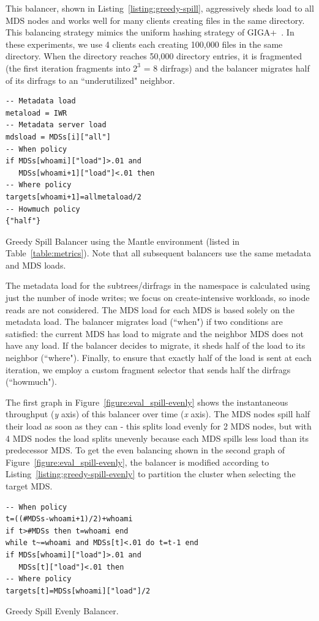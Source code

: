 This balancer, shown in Listing~\ref{listing:greedy-spill}, aggressively sheds load to all MDS nodes and works well for many clients creating files in the same directory. This balancing strategy mimics the uniform hashing strategy of GIGA+~\cite{patil:fast2011-giga+, ren:sc2014-indexfs}. In these experiments, we use 4 clients each creating 100,000 files in the same directory. When the directory reaches 50,000 directory entries, it is fragmented (the first iteration fragments into \(2^{3}\) = 8 dirfrags) and the balancer migrates half of its dirfrags to an ``underutilized" neighbor. 

\begin{listing}
	\begin{verbatim}
-- Metadata load
metaload = IWR
-- Metadata server load
mdsload = MDSs[i]["all"]
-- When policy
if MDSs[whoami]["load"]>.01 and 
   MDSs[whoami+1]["load"]<.01 then
-- Where policy
targets[whoami+1]=allmetaload/2
-- Howmuch policy
{"half"}
	\end{verbatim}
    \caption{Greedy Spill Balancer using the Mantle environment (listed in Table~\ref{table:metrics}). Note that all subsequent balancers use the same metadata and MDS loads.\label{listing:greedy-spill}}
\end{listing}

The metadata load for the subtrees/dirfrags in the namespace is calculated using just the number of inode writes; we focus on create-intensive workloads, so inode reads are not considered. The MDS load for each MDS is based solely on the metadata load. The balancer migrates load (``when") if two conditions are satisfied: the current MDS has load to migrate and the neighbor MDS does not have any load. If the balancer decides to migrate, it sheds half of the load to its neighbor (``where"). Finally, to ensure that exactly half of the load is sent at each iteration, we employ a custom fragment selector that sends half the dirfrags (``howmuch"). 

The first graph in Figure~\ref{figure:eval_spill-evenly} shows the instantaneous throughput ({\it y} axis) of this balancer over time ({\it x} axis). The MDS nodes spill half their load as soon as they can - this splits load evenly for 2 MDS nodes, but with 4 MDS nodes the load splits unevenly because each MDS spills less load than its predecessor MDS. To get the even balancing shown in the second graph of Figure~\ref{figure:eval_spill-evenly}, the balancer is modified according to Listing~\ref{listing:greedy-spill-evenly} to partition the cluster when selecting the target MDS.
\begin{listing}
	\begin{verbatim}
-- When policy
t=((#MDSs-whoami+1)/2)+whoami
if t>#MDSs then t=whoami end
while t~=whoami and MDSs[t]<.01 do t=t-1 end
if MDSs[whoami]["load"]>.01 and        
   MDSs[t]["load"]<.01 then
-- Where policy
targets[t]=MDSs[whoami]["load"]/2
	\end{verbatim}
    \caption{Greedy Spill Evenly Balancer.\label{listing:greedy-spill-evenly}}
\end{listing}

